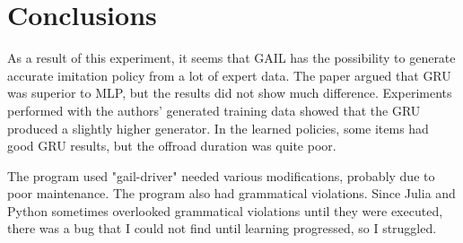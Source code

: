 \chapter{Conclusions}
\label{chapter:conclusions}

As a result of this experiment, it seems that GAIL has the possibility to generate accurate imitation policy from a lot of expert data. The paper argued that GRU was superior to MLP, but the results did not show much difference.
Experiments performed with the authors' generated training data showed that the GRU produced a slightly higher generator. In the learned policies, some items had good GRU results, but the offroad duration was quite poor.


The program used "gail-driver" needed various modifications, probably due to poor maintenance. The program also had grammatical violations. Since Julia and Python sometimes overlooked grammatical violations until they were executed, there was a bug that I could not find until learning progressed, so I struggled.